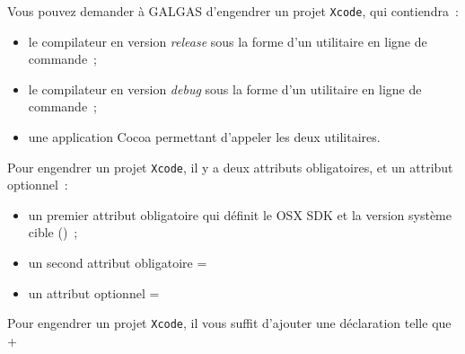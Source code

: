 



Vous pouvez demander à GALGAS d'engendrer un projet \texttt{Xcode}, qui contiendra~:
\begin{itemize}
  \item le compilateur en version \emph{release} sous la forme d'un utilitaire en ligne de commande~;
  \item le compilateur en version \emph{debug} sous la forme d'un utilitaire en ligne de commande~;
  \item une application Cocoa permettant d'appeler les deux utilitaires.
\end{itemize}







Pour engendrer un projet \texttt{Xcode}, il y a deux attributs obligatoires, et un attribut optionnel~:
\begin{itemize}
\item un premier attribut obligatoire qui définit le OSX SDK et la version système cible ()~;
\item un second attribut obligatoire \ggsq=%
\item un attribut optionnel \ggsq=%
\end{itemize}





Pour engendrer un projet \texttt{Xcode}, il vous suffit d'ajouter une déclaration telle que \ggsq+%

\begin{galgas4}
project (0:0:1) -> "logo" {
  ...
\end{galgas4}

